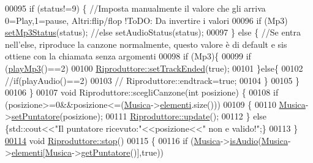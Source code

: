 \begin{DoxyCode}
00095     \textcolor{keywordflow}{if} (status!=9) \{ \textcolor{comment}{//Imposta manualmente il valore che gli arriva
       0=Play,1=pause, Altri:flip/flop !ToDO: Da invertire i valori}
00096         \textcolor{keywordflow}{if} (Mp3) \hyperlink{mpg123_8c_a852896f3beba9503ee018f0a1bdf28ea}{setMp3Status}(status); \textcolor{comment}{//else setAudioStatus(status);}
00097     \} \textcolor{keywordflow}{else} \{         \textcolor{comment}{//Se entra nell'else, riproduce la canzone normalmente,
       questo valore è di default e sis ottiene con la chiamata senza argomenti}
00098         \textcolor{keywordflow}{if} (Mp3)\{
00099             \textcolor{keywordflow}{if} (\hyperlink{mpg123_8c_a548762aaed08753cbed2cfabe0a5202b}{playMp3}()==2)
00100                 \hyperlink{classRiproduttore_aafc3cf55f8a95cfc5e3779294184db8b}{Riproduttore::setTrackEnded}(\textcolor{keyword}{true});
00101         \}\textcolor{keywordflow}{else}\{
00102             \textcolor{comment}{//if(playAudio()==2)}
00103             \textcolor{comment}{//  Riproduttore::endtrack=true;}
00104         \}
00105     \}
00106 \}
00107 \textcolor{keywordtype}{void} Riproduttore::scegliCanzone(\textcolor{keywordtype}{int} posizione) \{
00108     \textcolor{keywordflow}{if} (posizione>=0&&posizione<=(\hyperlink{classRiproduttore_a373b2d6675abc22dbe61abf2223cacab}{Musica}->\hyperlink{classusbData_ab0a9963ce896605e7e988e01e6efe1ba}{elementi}.size()))
00109     \{
00110         \hyperlink{classRiproduttore_a373b2d6675abc22dbe61abf2223cacab}{Musica}->\hyperlink{classusbData_a7fc551ced09d43cb53c94ca9f154c6a9}{setPuntatore}(posizione);
00111         \hyperlink{classRiproduttore_ae264ca70ff75d625fb9d41e8117cd800}{Riproduttore::update}();
00112     \} \textcolor{keywordflow}{else} \{std::cout<<\textcolor{stringliteral}{"Il puntatore ricevuto:"}<<posizione<<\textcolor{stringliteral}{" non e valido!"};\}
00113 \}
\hypertarget{Riproduttore_8cpp_source_l00114}{}\hyperlink{classRiproduttore_a837bea01fa68487694b661ec94781f5d}{00114} \textcolor{keywordtype}{void} \hyperlink{classRiproduttore_a837bea01fa68487694b661ec94781f5d}{Riproduttore::stop}()
00115 \{
00116     \textcolor{keywordflow}{if} (\hyperlink{classRiproduttore_a373b2d6675abc22dbe61abf2223cacab}{Musica}->\hyperlink{classusbData_a7405fda9e90402594fe24dc091bad0ec}{isAudio}(\hyperlink{classRiproduttore_a373b2d6675abc22dbe61abf2223cacab}{Musica}->\hyperlink{classusbData_ab0a9963ce896605e7e988e01e6efe1ba}{elementi}[\hyperlink{classRiproduttore_a373b2d6675abc22dbe61abf2223cacab}{Musica}->\hyperlink{classusbData_a3d872ce11202a145b83f0791d7eefebb}{getPuntatore}()],\textcolor{keyword}{true}))

\end{DoxyCode}
